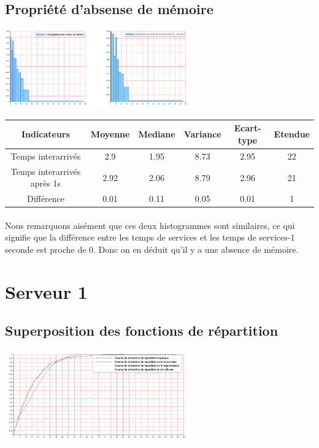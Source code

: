 \documentclass{article}
\begin{document}
\subsection{Propriété d'absense de mémoire}
\begin{center}
\includegraphics[width=300px]{img/S1_mem.png}
\end{center}

\begin{center}
\begin{tabular}{|c|c|c|c|c|c|}
  \hline
  Indicateurs & Moyenne & Mediane & Variance & Ecart-type & Etendue \\
  \hline
  Temps interarrivés & 2.9 & 1.95 & 8.73 & 2.95 & 22 \\
  Temps interarrivés après 1s & 2.92 & 2.06 & 8.79 & 2.96 & 21 \\
  Différence & 0.01 & 0.11 & 0.05 & 0.01 & 1 \\
  \hline
\end{tabular}
\end{center}

\paragraph{}
Nous remarquons aisément que ces deux histogrammes sont similaires, ce qui signifie que la différence entre les temps de services et les temps de services-1 seconde est proche de 0. Donc on en déduit qu’il y a une absence de mémoire.

\section{Serveur 1}

\subsection{Superposition des fonctions de répartition}
\begin{center}
\includegraphics[width=300px]{img/S1_repartitions.png}
\end{center}
\end{document}
